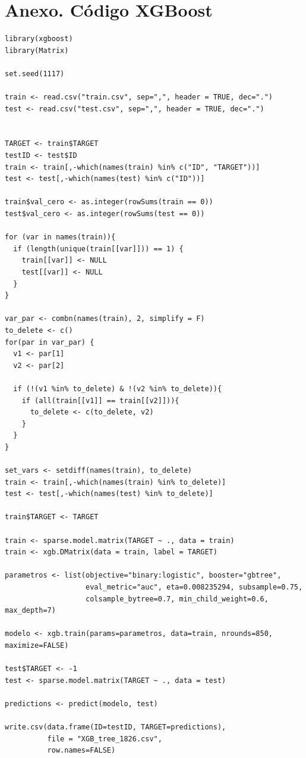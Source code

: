\documentclass[11pt,a4paper,spanish]{article} %
\begin{document}
\newpage

\section{Anexo. Código XGBoost}
{\scriptsize
\begin{verbatim}
library(xgboost)
library(Matrix)

set.seed(1117)

train <- read.csv("train.csv", sep=",", header = TRUE, dec=".")
test <- read.csv("test.csv", sep=",", header = TRUE, dec=".")


TARGET <- train$TARGET
testID <- test$ID
train <- train[,-which(names(train) %in% c("ID", "TARGET"))]
test <- test[,-which(names(test) %in% c("ID"))]

train$val_cero <- as.integer(rowSums(train == 0))
test$val_cero <- as.integer(rowSums(test == 0))

for (var in names(train)){
  if (length(unique(train[[var]])) == 1) {
    train[[var]] <- NULL
    test[[var]] <- NULL
  }
}

var_par <- combn(names(train), 2, simplify = F)
to_delete <- c()
for(par in var_par) {
  v1 <- par[1]
  v2 <- par[2]
  
  if (!(v1 %in% to_delete) & !(v2 %in% to_delete)){
    if (all(train[[v1]] == train[[v2]])){
      to_delete <- c(to_delete, v2)
    }
  }
}

set_vars <- setdiff(names(train), to_delete)
train <- train[,-which(names(train) %in% to_delete)]
test <- test[,-which(names(test) %in% to_delete)]

train$TARGET <- TARGET

train <- sparse.model.matrix(TARGET ~ ., data = train)
train <- xgb.DMatrix(data = train, label = TARGET)

parametros <- list(objective="binary:logistic", booster="gbtree", 
                   eval_metric="auc", eta=0.008235294, subsample=0.75, 
                   colsample_bytree=0.7, min_child_weight=0.6, max_depth=7)

modelo <- xgb.train(params=parametros, data=train, nrounds=850, maximize=FALSE)

test$TARGET <- -1
test <- sparse.model.matrix(TARGET ~ ., data = test)

predictions <- predict(modelo, test)

write.csv(data.frame(ID=testID, TARGET=predictions), 
          file = "XGB_tree_1826.csv",
          row.names=FALSE)
\end{verbatim}
}
\end{document}
